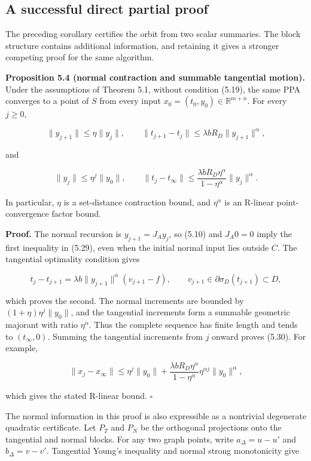 \documentclass[11pt,a4paper]{article}
\theoremstyle{plain}
\theoremstyle{definition}
\theoremstyle{remark}
\begin{document}
\hypertarget{a-successful-direct-partial-proof}{%
\subsection{A successful direct partial
proof}\label{a-successful-direct-partial-proof}}

The preceding corollary certifies the orbit from two scalar summaries.
The block structure contains additional information, and retaining it
gives a stronger competing proof for the same algorithm.

\textbf{Proposition 5.4 (normal contraction and summable tangential
motion).} Under the assumptions of Theorem 5.1, without condition
(5.19), the same PPA converges to a point of \(S\) from every input
\(x_0=(t_0,y_0)\in\mathbb R^{m+n}\). For every \(j\ge0\),

\[
\|y_{j+1}\|\le\eta\|y_j\|,
\qquad
\|t_{j+1}-t_j\|
\le\lambda bR_D\|y_{j+1}\|^\alpha,
\tag{5.29}
\]

and

\[
\|y_j\|\le\eta^j\|y_0\|,
\qquad
\|t_j-t_\infty\|
\le\frac{\lambda bR_D\eta^\alpha}{1-\eta^\alpha}\|y_j\|^\alpha.
\tag{5.30}
\]

In particular, \(\eta\) is a set-distance contraction bound, and
\(\eta^\alpha\) is an R-linear point-convergence factor bound.

\textbf{Proof.} The normal recursion is \(y_{j+1}=J_Ay_j\), so (5.10)
and \(J_A0=0\) imply the first inequality in (5.29), even when the
initial normal input lies outside \(C\). The tangential optimality
condition gives

\[
t_j-t_{j+1}=\lambda b\|y_{j+1}\|^\alpha(v_{j+1}-f),
\qquad v_{j+1}\in\partial\sigma_D(t_{j+1})\subset D,
\]

which proves the second. The normal increments are bounded by
\((1+\eta)\eta^j\|y_0\|\), and the tangential increments form a summable
geometric majorant with ratio \(\eta^\alpha\). Thus the complete
sequence has finite length and tends to \((t_\infty,0)\). Summing the
tangential increments from \(j\) onward proves (5.30). For example,

\[
\|x_j-x_\infty\|
\le\eta^j\|y_0\|
+\frac{\lambda bR_D\eta^\alpha}{1-\eta^\alpha}
\eta^{\alpha j}\|y_0\|^\alpha,
\tag{5.31}
\]

which gives the stated R-linear bound. \(\square\)

The normal information in this proof is also expressible as a nontrivial
degenerate quadratic certificate. Let \(P_T\) and \(P_N\) be the
orthogonal projections onto the tangential and normal blocks. For any
two graph points, write \(a_\Delta=u-u'\) and \(b_\Delta=v-v'\).
Tangential Young's inequality and normal strong monotonicity give
\end{document}
